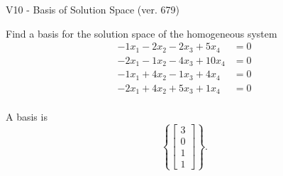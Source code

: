 \begin{exercise}
  \begin{exerciseTitle}V10 - Basis of Solution Space (ver. 679)\end{exerciseTitle}
  \begin{exerciseStatement}
    Find a basis for the solution space of the homogeneous system 
\begin{align*}
 -1 x_ 1 -2 x_ 2 -2 x_ 3 + 5 x_ 4 &= 0  \\ 
  -2 x_ 1 -1 x_ 2 -4 x_ 3 + 10 x_ 4 &= 0  \\ 
  -1 x_ 1 + 4 x_ 2 -1 x_ 3 + 4 x_ 4 &= 0  \\ 
  -2 x_ 1 + 4 x_ 2 + 5 x_ 3 + 1 x_ 4 &= 0  \\ 
 \end{align*}


 
  \end{exerciseStatement}

  \begin{exerciseAnswer}
   A basis is   
\[\left\{\left[\begin{array}{c}
3 \\
0 \\
1 \\
1
\end{array}\right]\right\}.\]

  


  \end{exerciseAnswer}
\end{exercise}